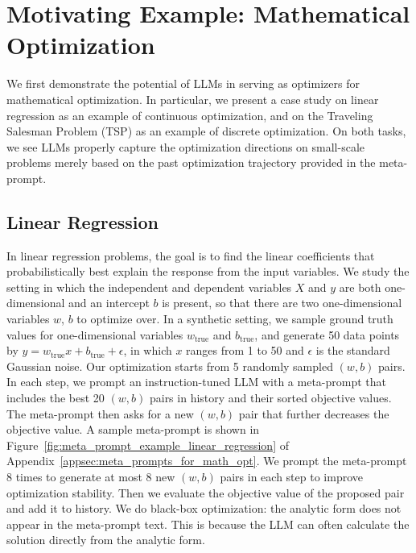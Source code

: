 \section{Motivating Example: Mathematical Optimization}
\label{sec:motivating_example}

We first demonstrate the potential of LLMs in serving as optimizers for mathematical optimization. 
In particular, we present a case study on linear regression as an example of continuous optimization, and on the Traveling Salesman Problem (TSP) as an example of discrete optimization. 
On both tasks, we see LLMs properly capture the optimization directions on small-scale problems merely based on the past optimization trajectory provided in the meta-prompt.

\subsection{Linear Regression}

In linear regression problems, the goal is to find the linear coefficients that probabilistically best explain the response from the input variables.
We study the setting in which the independent and dependent variables $X$ and $y$ are both one-dimensional and an intercept $b$ is present, so that there are two one-dimensional variables $w$, $b$ to optimize over.
In a synthetic setting, we sample ground truth values for one-dimensional variables $w_\text{true}$ and $b_\text{true}$, and generate 50 data points by $y = w_\text{true} x + b_\text{true} + \epsilon$, in which $x$ ranges from 1 to 50 and $\epsilon$ is the standard Gaussian noise.
Our optimization starts from 5 randomly sampled $(w, b)$ pairs.
In each step, we prompt an instruction-tuned LLM with a meta-prompt that includes the best 20 $(w, b)$ pairs in history and their sorted objective values.
The meta-prompt then asks for a new $(w, b)$ pair that further decreases the objective value.
A sample meta-prompt is shown in Figure~\ref{fig:meta_prompt_example_linear_regression} of Appendix~\ref{appsec:meta_prompts_for_math_opt}.
We prompt the meta-prompt 8 times to generate at most 8 new $(w, b)$ pairs in each step to improve optimization stability.
Then we evaluate the objective value of the proposed pair and add it to history.
We do black-box optimization: the analytic form does not appear in the meta-prompt text.
This is because the LLM can often calculate the solution directly from the analytic form.

